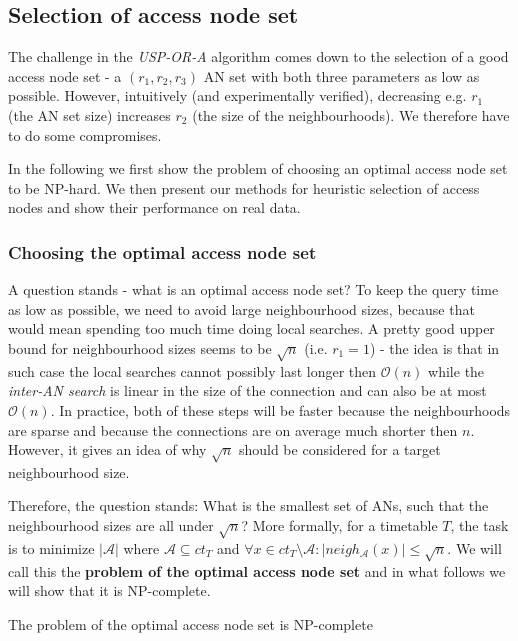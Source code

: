\subsection{Selection of access node set}
	
	The challenge in the \textit{USP-OR-A} algorithm comes down to the selection of a good access node set - a $(r_{1}, r_{2}, r_{3})$ AN set with both three parameters as low as possible. However, intuitively (and experimentally verified), decreasing e.g. $r_{1}$ (the AN set size) increases $r_{2}$ (the size of the neighbourhoods). We therefore have to do some compromises.
	
	In the following we first show the problem of choosing an optimal access node set to be NP-hard. We then present our methods for heuristic selection of access nodes and show their performance on real data.
	    
	\subsubsection{Choosing the optimal access node set}

		A question stands - what is an optimal access node set?	To keep the query time as low as possible, we need to avoid large neighbourhood sizes, because that would mean spending too much time doing local searches. A pretty good upper bound for neighbourhood sizes seems to be $\sqrt{n}$ (i.e. $r_{1} = 1$) - the idea is that in such case the local searches cannot possibly last longer then $\mathcal{O}(n)$ while the \textit{inter-AN search} is linear in the size of the connection and can also be at most $\mathcal{O}(n)$. In practice, both of these steps will be faster because the neighbourhoods are sparse and because the connections are on average much shorter then $n$. However, it gives an idea of why $\sqrt{n}$ should be considered for a target neighbourhood size.
		
		Therefore, the question stands: What is the smallest set of ANs, such that the neighbourhood sizes are all under $\sqrt{n}$? More formally, for a timetable $T$, the task is to minimize $|\mathcal{A}|$ where $\mathcal{A} \subseteq ct_{T}$ and $\forall x \in ct_{T} \setminus \mathcal{A}: |neigh_{\mathcal{A}}(x)| \leq \sqrt{n}$. We will call this the \textbf{problem of the optimal access node set} and in what follows we will show that it is NP-complete.
		
		\begin{theorem}
			The problem of the optimal access node set is NP-complete
		\end{theorem}
		
